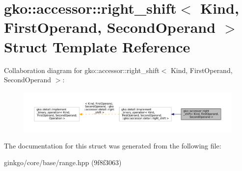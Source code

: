 \hypertarget{structgko_1_1accessor_1_1right__shift}{}\section{gko\+:\+:accessor\+:\+:right\+\_\+shift$<$ Kind, First\+Operand, Second\+Operand $>$ Struct Template Reference}
\label{structgko_1_1accessor_1_1right__shift}


Collaboration diagram for gko\+:\+:accessor\+:\+:right\+\_\+shift$<$ Kind, First\+Operand, Second\+Operand $>$\+:
\nopagebreak
\begin{figure}[H]
\begin{center}
\leavevmode
\includegraphics[width=350pt]{structgko_1_1accessor_1_1right__shift__coll__graph}
\end{center}
\end{figure}


The documentation for this struct was generated from the following file\+:\begin{DoxyCompactItemize}
\item 
ginkgo/core/base/range.\+hpp (9f8f3063)\end{DoxyCompactItemize}
